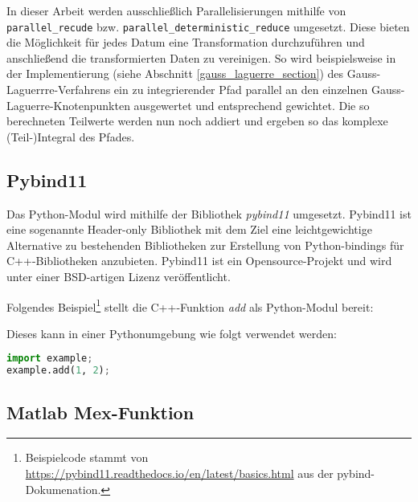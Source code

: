 \begin{center}
    
\end{center}

In dieser Arbeit werden ausschließlich Parallelisierungen mithilfe von \linebreak \texttt{parallel\_recude} bzw. \texttt{parallel\_deterministic\_reduce} umgesetzt.
Diese bieten die Möglichkeit für jedes Datum eine Transformation durchzuführen und anschließend die transformierten Daten zu vereinigen. 
So wird beispielsweise in der Implementierung (siehe Abschnitt \ref{gauss_laguerre_section}) des Gauss-Laguerrre-Verfahrens ein zu integrierender Pfad parallel an den einzelnen Gauss-Laguerre-Knotenpunkten ausgewertet und entsprechend gewichtet.
Die so berechneten Teilwerte werden nun noch addiert und ergeben so das komplexe (Teil-)Integral des Pfades. 

\subsection{Pybind11}

Das Python-Modul wird mithilfe der Bibliothek \textit{pybind11} umgesetzt.
Pybind11 ist eine sogenannte Header-only Bibliothek mit dem Ziel eine leichtgewichtige Alternative zu bestehenden Bibliotheken zur Erstellung  von
Python-bindings für C++-Bibliotheken anzubieten.
Pybind11\cite{pybind} ist ein Opensource-Projekt und wird unter einer BSD-artigen Lizenz veröffentlicht. 

Folgendes Beispiel\footnote{Beispielcode stammt von \url{https://pybind11.readthedocs.io/en/latest/basics.html} aus der pybind-Dokumenation\cite{pybind}.} stellt die C++-Funktion \textit{add} als Python-Modul bereit:
\begin{center}

\end{center}
Dieses kann in einer Pythonumgebung wie folgt verwendet werden:

\begin{center}
\begin{lstlisting}[language=Python]
import example;
example.add(1, 2);
\end{lstlisting}
\end{center}



\subsection{Matlab Mex-Funktion}

